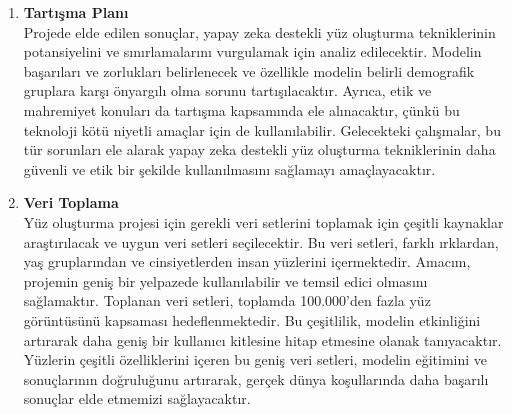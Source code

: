 \documentclass[12pt, a4paper]{article}
\begin{document}
\begin{enumerate}
		\item \textbf{Tartışma Planı}
		\\Projede elde edilen sonuçlar, yapay zeka destekli yüz oluşturma tekniklerinin potansiyelini ve sınırlamalarını vurgulamak için analiz edilecektir. Modelin başarıları ve zorlukları belirlenecek ve özellikle modelin belirli demografik gruplara karşı önyargılı olma sorunu tartışılacaktır. Ayrıca, etik ve mahremiyet konuları da tartışma kapsamında ele alınacaktır, çünkü bu teknoloji kötü niyetli amaçlar için de kullanılabilir. Gelecekteki çalışmalar, bu tür sorunları ele alarak yapay zeka destekli yüz oluşturma tekniklerinin daha güvenli ve etik bir şekilde kullanılmasını sağlamayı amaçlayacaktır.
		\item \textbf{Veri Toplama}
		\\Yüz oluşturma projesi için gerekli veri setlerini toplamak için çeşitli kaynaklar araştırılacak ve uygun veri setleri seçilecektir. Bu veri setleri, farklı ırklardan, yaş gruplarından ve cinsiyetlerden insan yüzlerini içermektedir. Amacım, projemin geniş bir yelpazede kullanılabilir ve temsil edici olmasını sağlamaktır. Toplanan veri setleri, toplamda 100.000'den fazla yüz görüntüsünü kapsaması hedeflenmektedir. Bu çeşitlilik, modelin etkinliğini artırarak daha geniş bir kullanıcı kitlesine hitap etmesine olanak tanıyacaktır. Yüzlerin çeşitli özelliklerini içeren bu geniş veri setleri, modelin eğitimini ve sonuçlarının doğruluğunu artırarak, gerçek dünya koşullarında daha başarılı sonuçlar elde etmemizi sağlayacaktır.
		

\end{enumerate}
\end{document}
